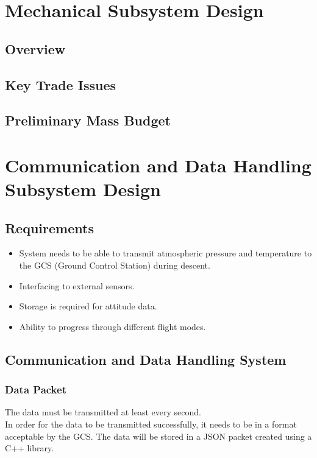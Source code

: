 \newpage

\section{Mechanical Subsystem Design}
\subsection{Overview}
\subsection{Key Trade Issues}
\subsection{Preliminary Mass Budget}

\newpage

\section{Communication and Data Handling Subsystem Design}
\subsection{Requirements}
\begin{itemize}
    \item System needs to be able to transmit atmospheric pressure and temperature to the GCS (Ground Control Station) during descent.
    \item Interfacing to external sensors.
    \item Storage is required for attitude data.
    \item Ability to progress through different flight modes.
\end{itemize}
\subsection{Communication and Data Handling System}
\subsubsection{Data Packet}

The data must be transmitted at least every second.\\

In order for the data to be transmitted successfully, it needs to be in a format acceptable by the GCS. The data will be stored in a JSON packet created using a C++ library\cite{ajson}.

